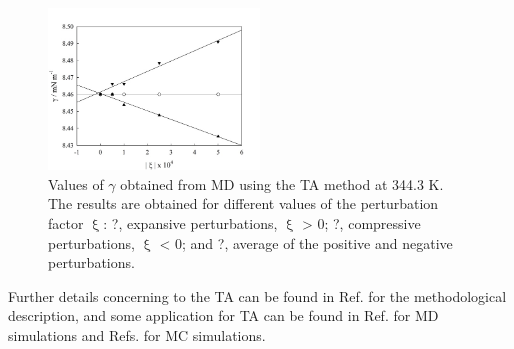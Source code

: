 \documentclass[9pt,bestpractices]{livecoms}
\begin{document}
\begin{figure}
\includegraphics[width=0.5\textwidth]{gfx/image66.jpeg}
\caption{Values of {${\gamma}$} obtained from MD using the TA method at 344.3 K. The results are obtained for different values of the perturbation factor ${\upxi}$: ?, expansive perturbations, ${\upxi}$ {\textgreater} 0; ?, compressive perturbations, ${\upxi}$ {\textless} 0; and ?, average of the positive and negative perturbations.}
\label{fig:20}
\end{figure}

Further details concerning to the TA can be found in Ref.
\citep{gloor2005} for the methodological description, and some
application for TA can be found in Ref. \citep{muller2009}
for MD simulations and Refs. \citep{ghoufi2016,sampayo2010} for MC simulations.
\end{document}
